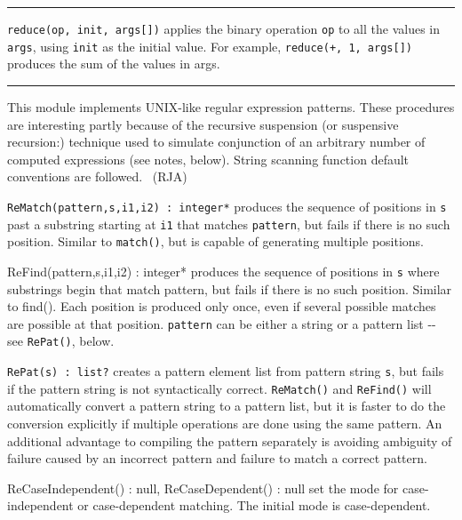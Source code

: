 \vspace{0.25cm}\hrule{}

\texttt{reduce(op, init, args[])} applies the binary
operation \texttt{op} to all the values in \texttt{args}, using
\texttt{init} as the initial value. For example,
\texttt{reduce({\textquotedbl}+{\textquotedbl}, 1, args[])} produces
the sum of the values in args. 

\vspace{0.25cm}\hrule{}

This module implements UNIX-like regular
expression patterns. These procedures are interesting partly because of
the {\textquotedbl}recursive suspension{\textquotedbl} (or
{\textquotedbl}suspensive recursion{\textquotedbl}:)
technique used to simulate conjunction of an arbitrary number of
computed expressions (see notes, below). String scanning function
default conventions are followed. \ (RJA)

\texttt{ReMatch(pattern,s,i1,i2) : integer*} produces the sequence of
positions in \texttt{s} past a substring starting at \texttt{i1} that
matches \texttt{pattern}, but fails if there is no such position.
Similar to \texttt{match()}, but is capable of generating multiple
positions.

\textsf{ReFind(pattern,s,i1,i2) : integer*} produces the sequence of
positions in \texttt{s} where substrings begin that match
\textsf{pattern}, but fails if there is no such position. Similar to
\textsf{find()}. Each position is produced only once, even if several
possible matches are possible at that position. \texttt{pattern} can be
either a string or a pattern list -{}- see \texttt{RePat()}, below.

\texttt{RePat(s) : list?} creates a pattern element list from pattern
string \texttt{s}, but fails if the pattern string is not syntactically
correct. \texttt{ReMatch()} and \texttt{ReFind()} will automatically
convert a pattern string to a pattern list, but it is faster to do the
conversion explicitly if multiple operations are done using the same
pattern. An additional advantage to compiling the pattern separately is
avoiding ambiguity of failure caused by an incorrect pattern and
failure to match a correct pattern.

\textsf{ReCaseIndependent() : null, ReCaseDependent() : null} set the
mode for case-independent or case-dependent matching. The initial mode
is case-dependent.

